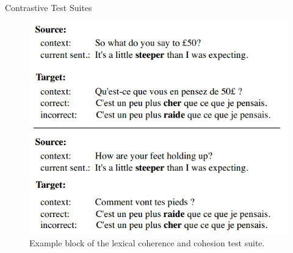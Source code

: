 \begin{frame}{Contrastive Test Suites}
	\begin{figure}
		\centering
		\includegraphics[width=0.57\linewidth]{Images/coherence_test_suite}
		\caption{Example block of the lexical coherence and cohesion test suite.}
		\label{fig:coherencetestsuite}
	\end{figure}
\end{frame}


